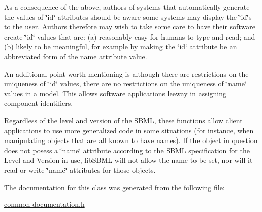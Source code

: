 As a consequence of the above, authors of systems that automatically generate the values of \char`\"{}id\char`\"{} attributes should be aware some systems may display the \char`\"{}id\char`\"{}\textquotesingle{}s to the user. Authors therefore may wish to take some care to have their software create \char`\"{}id\char`\"{} values that are\+: (a) reasonably easy for humans to type and read; and (b) likely to be meaningful, for example by making the \char`\"{}id\char`\"{} attribute be an abbreviated form of the name attribute value.

An additional point worth mentioning is although there are restrictions on the uniqueness of \char`\"{}id\char`\"{} values, there are no restrictions on the uniqueness of \char`\"{}name\char`\"{} values in a model. This allows software applications leeway in assigning component identifiers.

Regardless of the level and version of the S\+B\+ML, these functions allow client applications to use more generalized code in some situations (for instance, when manipulating objects that are all known to have names). If the object in question does not posess a \char`\"{}name\char`\"{} attribute according to the S\+B\+ML specification for the Level and Version in use, lib\+S\+B\+ML will not allow the name to be set, nor will it read or write \char`\"{}name\char`\"{} attributes for those objects. 

The documentation for this class was generated from the following file\+:\begin{DoxyCompactItemize}
\item 
\hyperlink{common-documentation_8h}{common-\/documentation.\+h}\end{DoxyCompactItemize}

